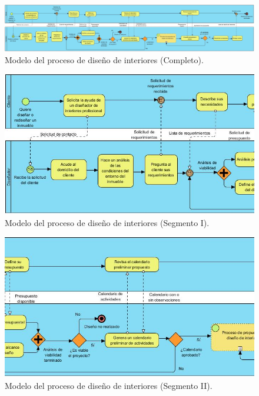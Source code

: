 \begin{figure}[!htbp]
	\centering
	\includegraphics[width=18cm,angle=270,origin=c]{imagenes/marcoteorico/bpmn/proceso_full.jpg}
	\caption{Modelo del proceso de diseño de interiores (Completo).}
	\label{fig:bpmn_antes}
\end{figure}
\newpage

\begin{figure}[!htbp]
	\centering
	\includegraphics[width=18cm,angle=270,origin=c]{imagenes/marcoteorico/bpmn/proceso_01_01.jpg}
	\caption{Modelo del proceso de diseño de interiores (Segmento I).}
	\label{fig:bpmn_antes}
\end{figure}
\newpage

\begin{figure}[!htbp]
	\centering
	\includegraphics[width=18cm,angle=270,origin=c]{imagenes/marcoteorico/bpmn/proceso_02_01.jpg}
	\caption{Modelo del proceso de diseño de interiores (Segmento II).}
	\label{fig:bpmn_antes}
\end{figure}
\newpage

